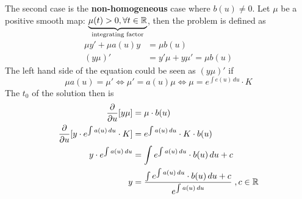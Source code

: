 The second case is the \textbf{non-homogeneous} case where $b(u)\neq0$.
Let $\mu$ be a positive smooth map: $\underbrace{\mu(t)>0, \forall t\in\mathbb{R}}_{\text{integrating factor}}$, then the problem is defined as
\begin{align*}
    \mu y' + \mu a(u) y & = \mu b(u)\\
    (y\mu)' & = y'\mu + y\mu' = \mu b(u)
\end{align*}
The left hand side of the equation could be seen as $(y\mu)'$ if
\begin{equation*}
    \mu a(u) = \mu' \Leftrightarrow \mu' = a(u)\mu \Leftrightarrow \mu = e^{\int e(u)\, du}\cdot K
\end{equation*}
The $t_0$ of the solution then is
\begin{align*}
    \frac{\partial}{\partial u}[y\mu] & = \mu\cdot b(u)\\
    \frac{\partial}{\partial u}[y\cdot e^{\int a(u)\, du}\cdot K] & = e^{\int a(u)\,du}\cdot K \cdot b(u)\\
    y\cdot e^{\int a(u)\, du} & = \int e^{\int a(u)\, du}\cdot b(u)\, du + c\\
    y & = \frac{\int e^{\int a(u)\, du}\cdot b(u)\, du + c}{e^{\int a(u)\, du}}\; ,c\in\mathbb{R}
\end{align*}

